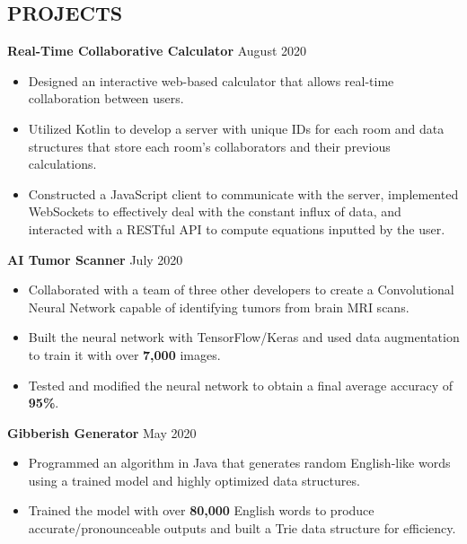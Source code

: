 \documentclass[11pt]{res}
\begin{document}
\begin{footnotesize}
\begin{resume}
\section{PROJECTS} 
\textbf{Real-Time Collaborative Calculator} \hfill August 2020\vspace{-5.25mm}
\begin{itemize} \itemsep -2pt 
\item Designed an interactive web-based calculator that allows real-time collaboration between users. 
\vspace{.75mm}
\item Utilized Kotlin to develop a server with unique IDs for each room and data structures that store each room's collaborators and their previous calculations.
\vspace{.75mm}
\item Constructed a JavaScript client to communicate with the server, implemented WebSockets to effectively deal with the constant influx of data, and interacted with a RESTful API to compute equations inputted by the user.  
\end{itemize}
\vspace{-2.5mm}
\textbf{AI Tumor Scanner}  \hfill July 2020\vspace{-5.25mm}
\begin{itemize} \itemsep -2pt 
\item Collaborated with a team of three other developers to create a Convolutional Neural Network capable of identifying tumors from brain MRI scans. 
\vspace{.75mm}
\item Built the neural network with TensorFlow/Keras and used data augmentation to train it with over \textbf{7,000} images.
\vspace{.75mm}
\item Tested and modified the neural network to obtain a final average accuracy of \textbf{95\%}.
\end{itemize}
\vspace{-2.5mm}
\textbf{Gibberish Generator} \hfill May 2020\vspace{-5.25mm}
\begin{itemize} \itemsep -2pt 
\item Programmed an algorithm in Java that generates random English-like words using a trained model and highly optimized data structures.  
\vspace{.75mm}
\item Trained the model with over \textbf{80,000} English words to produce accurate/pronounceable outputs and built a Trie data structure for efficiency.

\end{itemize}
\end{resume}
\end{footnotesize}
\end{document}
